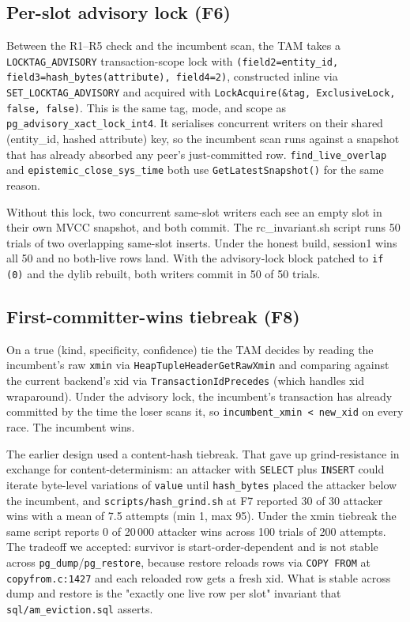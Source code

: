 \documentclass[sigconf, nonacm]{acmart}
\begin{document}
\subsection{Per-slot advisory lock (F6)}
Between the R1--R5 check and the incumbent scan, the TAM takes a \texttt{LOCKTAG\_ADVISORY} transaction-scope lock with \texttt{(field2=entity\_id, field3=hash\_bytes(attribute), field4=2)}, constructed inline via \texttt{SET\_LOCKTAG\_ADVISORY} and acquired with \texttt{LockAcquire(\&tag, ExclusiveLock, false, false)}. This is the same tag, mode, and scope as \texttt{pg\_advisory\_xact\_lock\_int4}. It serialises concurrent writers on their shared (entity\_id, hashed attribute) key, so the incumbent scan runs against a snapshot that has already absorbed any peer's just-committed row. \texttt{find\_live\_overlap} and \texttt{epistemic\_close\_sys\_time} both use \texttt{GetLatestSnapshot()} for the same reason.

Without this lock, two concurrent same-slot writers each see an empty slot in their own MVCC snapshot, and both commit. The rc\_invariant.sh script runs 50 trials of two overlapping same-slot inserts. Under the honest build, session1 wins all 50 and no both-live rows land. With the advisory-lock block patched to \texttt{if (0)} and the dylib rebuilt, both writers commit in 50 of 50 trials.

\subsection{First-committer-wins tiebreak (F8)}
On a true (kind, specificity, confidence) tie the TAM decides by reading the incumbent's raw \texttt{xmin} via \texttt{HeapTupleHeaderGetRawXmin} and comparing against the current backend's xid via \texttt{TransactionIdPrecedes} (which handles xid wraparound). Under the advisory lock, the incumbent's transaction has already committed by the time the loser scans it, so \texttt{incumbent\_xmin < new\_xid} on every race. The incumbent wins.

The earlier design used a content-hash tiebreak. That gave up grind-resistance in exchange for content-determinism: an attacker with \texttt{SELECT} plus \texttt{INSERT} could iterate byte-level variations of \texttt{value} until \texttt{hash\_bytes} placed the attacker below the incumbent, and \texttt{scripts/hash\_grind.sh} at F7 reported 30 of 30 attacker wins with a mean of 7.5 attempts (min 1, max 95). Under the xmin tiebreak the same script reports 0 of 20\,000 attacker wins across 100 trials of 200 attempts. The tradeoff we accepted: survivor is start-order-dependent and is not stable across \texttt{pg\_dump}/\texttt{pg\_restore}, because restore reloads rows via \texttt{COPY FROM} at \texttt{copyfrom.c:1427} and each reloaded row gets a fresh xid. What is stable across dump and restore is the "exactly one live row per slot" invariant that \texttt{sql/am\_eviction.sql} asserts.
\end{document}
